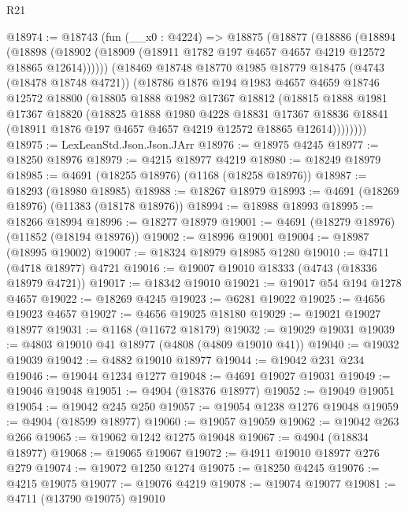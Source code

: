 \begin{lexlean}{R21}
\begin{coremodule}
@18974 := @18743
    (fun (__x0 : @4224) =>
    @18875
      (@18877
        (@18886
          (@18894
            (@18898 (@18902 (@18909 (@18911 @1782 @197 @4657 @4657 @4219 @12572 @18865 @12614))))))
        (@18469
          @18748
          @18770
          @1985
          @18779
          @18475
          (@4743 (@18478 @18748 @4721))
          (@18786
            @1876
            @194
            @1983
            @4657
            @4659
            @18746
            @12572
            @18800
            (@18805
              @1888
              @1982
              @17367
              @18812
              (@18815
                @1888
                @1981
                @17367
                @18820
                (@18825
                  @1888
                  @1980
                  @4228
                  @18831
                  @17367
                  @18836
                  @18841
                  (@18911 @1876 @197 @4657 @4657 @4219 @12572 @18865 @12614))))))))
@18975 := LexLeanStd.Json.Json.JArr
@18976 := @18975 @4245
@18977 := @18250 @18976
@18979 := @4215 @18977 @4219
@18980 := @18249 @18979
@18985 := @4691 (@18255 @18976) (@1168 (@18258 @18976))
@18987 := @18293 (@18980 @18985)
@18988 := @18267 @18979
@18993 := @4691 (@18269 @18976) (@11383 (@18178 @18976))
@18994 := @18988 @18993
@18995 := @18266 @18994
@18996 := @18277 @18979
@19001 := @4691 (@18279 @18976) (@11852 (@18194 @18976))
@19002 := @18996 @19001
@19004 := @18987 (@18995 @19002)
@19007 := @18324 @18979 @18985 @1280
@19010 := @4711 (@4718 @18977) @4721
@19016 := @19007 @19010 @18333 (@4743 (@18336 @18979 @4721))
@19017 := @18342 @19010
@19021 := @19017 @54 @194 @1278 @4657
@19022 := @18269 @4245
@19023 := @6281 @19022
@19025 := @4656 @19023 @4657
@19027 := @4656 @19025 @18180
@19029 := @19021 @19027 @18977
@19031 := @1168 (@11672 @18179)
@19032 := @19029 @19031
@19039 := @4803 @19010 @41 @18977 (@4808 (@4809 @19010 @41))
@19040 := @19032 @19039
@19042 := @4882 @19010 @18977
@19044 := @19042 @231 @234
@19046 := @19044 @1234 @1277
@19048 := @4691 @19027 @19031
@19049 := @19046 @19048
@19051 := @4904 (@18376 @18977)
@19052 := @19049 @19051
@19054 := @19042 @245 @250
@19057 := @19054 @1238 @1276 @19048
@19059 := @4904 (@18599 @18977)
@19060 := @19057 @19059
@19062 := @19042 @263 @266
@19065 := @19062 @1242 @1275 @19048
@19067 := @4904 (@18834 @18977)
@19068 := @19065 @19067
@19072 := @4911 @19010 @18977 @276 @279
@19074 := @19072 @1250 @1274
@19075 := @18250 @4245
@19076 := @4215 @19075
@19077 := @19076 @4219
@19078 := @19074 @19077
@19081 := @4711 (@13790 @19075) @19010

\end{coremodule}
\end{lexlean}
